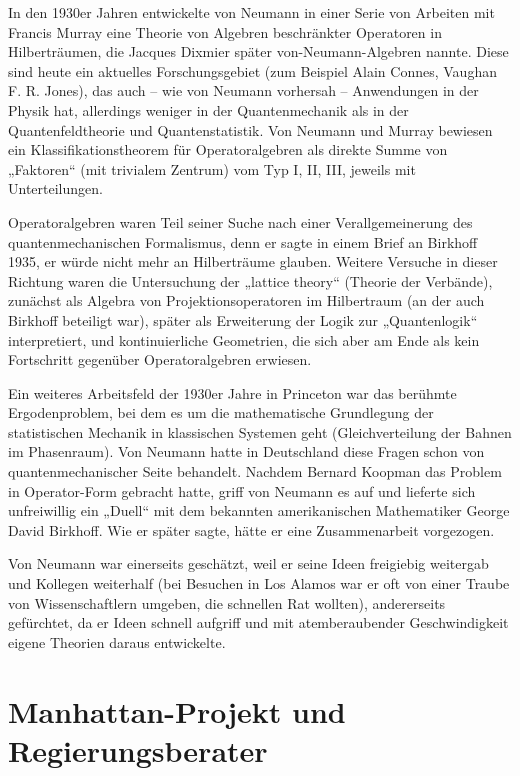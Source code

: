 In den 1930er Jahren entwickelte von Neumann\cite{games} in einer Serie von Arbeiten mit Francis Murray eine Theorie von Algebren beschränkter Operatoren in Hilberträumen, die Jacques Dixmier später von-Neumann-Algebren nannte. Diese sind heute ein aktuelles Forschungsgebiet (zum Beispiel Alain Connes, Vaughan F. R. Jones), das auch – wie von Neumann vorhersah – Anwendungen in der Physik hat, allerdings weniger in der Quantenmechanik als in der Quantenfeldtheorie und Quantenstatistik. Von Neumann und Murray bewiesen ein Klassifikationstheorem für Operatoralgebren als direkte Summe von „Faktoren“ (mit trivialem Zentrum) vom Typ I, II, III, jeweils mit Unterteilungen.

Operatoralgebren waren Teil seiner Suche nach einer Verallgemeinerung des quantenmechanischen Formalismus, denn er sagte in einem Brief an Birkhoff 1935, er würde nicht mehr an Hilberträume glauben. Weitere Versuche in dieser Richtung waren die Untersuchung der „lattice theory“ (Theorie der Verbände), zunächst als Algebra von Projektionsoperatoren im Hilbertraum (an der auch Birkhoff beteiligt war), später als Erweiterung der Logik zur „Quantenlogik“ interpretiert, und kontinuierliche Geometrien, die sich aber am Ende als kein Fortschritt gegenüber Operatoralgebren erwiesen.

Ein weiteres Arbeitsfeld der 1930er Jahre in Princeton war das berühmte Ergodenproblem, bei dem es um die mathematische Grundlegung der statistischen Mechanik in klassischen Systemen geht (Gleichverteilung der Bahnen im Phasenraum). Von Neumann hatte in Deutschland diese Fragen schon von quantenmechanischer Seite behandelt. Nachdem Bernard Koopman das Problem in Operator-Form gebracht hatte, griff von Neumann es auf und lieferte sich unfreiwillig ein „Duell“ mit dem bekannten amerikanischen Mathematiker George David Birkhoff. Wie er später sagte, hätte er eine Zusammenarbeit vorgezogen.

Von Neumann war einerseits geschätzt, weil er seine Ideen freigiebig weitergab und Kollegen weiterhalf (bei Besuchen in Los Alamos war er oft von einer Traube von Wissenschaftlern umgeben, die schnellen Rat wollten), andererseits gefürchtet, da er Ideen schnell aufgriff und mit atemberaubender Geschwindigkeit eigene Theorien daraus entwickelte.

\section{Manhattan-Projekt und Regierungsberater}

